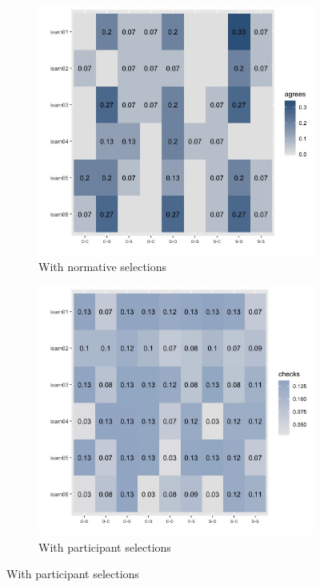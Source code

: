 \documentclass{article}
\begin{document}
\begin{figure}[h!]
  \centering
  \begin{subfigure}[t]{0.45\textwidth}
    \centering
    \includegraphics[width=\linewidth]{nine_theories_w_norm} 
    \caption{With normative selections}
  \end{subfigure}
  \hfill
  \begin{subfigure}[t]{0.45\textwidth}
    \centering
    \includegraphics[width=\linewidth]{nine_theories_w_ppt} 
    \caption{With participant selections}
  \end{subfigure}
  \label{fig:theory_comp}

\end{figure}
\end{document}
